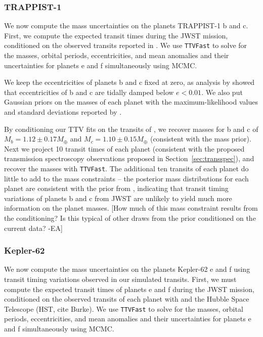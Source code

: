 \subsubsection{TRAPPIST-1}


We now compute the mass uncertainties on the planets TRAPPIST-1 b and c. First, we compute the expected transit times during the JWST mission, conditioned on the observed transits reported in \citet{Grimm2018}. We use \texttt{TTVFast} to solve for the masses, orbital periods, eccentricities, and mean anomalies and their uncertainties for planets e and f simultaneously using MCMC. 

We keep the eccentricities of planets b and c fixed at zero, as analysis by \citet{Luger2017} showed that eccentricities of b and c are tidally damped below $e < 0.01$. We also put Gaussian priors on the masses of each planet with the maximum-likelihood values and standard deviations reported by \citet{Grimm2018}.

By conditioning our TTV fits on the transits of \citet{Grimm2018}, we recover masses for b and c of $M_b = 1.12 \pm 0.17 M_\oplus$ and $M_c = 1.10 \pm 0.15 M_\oplus$ (consistent with the mass prior). Next we project 10 transit times of each planet (consistent with the proposed transmission spectroscopy observations proposed in Section~\ref{sec:transspec}), and recover the masses with \texttt{TTVFast}. The additional ten transits of each planet do little to add to the mass constraints -- the posterior mass distributions for each planet are consistent with the prior from \citet{Grimm2018}, indicating that transit timing variations of planets b and c from JWST are unlikely to yield much more information on the planet masses.  [How much of this mass constraint results from the conditioning?  Is this typical of other draws from the prior conditioned on the current data? -EA] 


\subsubsection{Kepler-62}

We now compute the mass uncertainties on the planets Kepler-62 e and f using transit timing variations observed in our simulated transits. First, we must compute the expected transit times of planets e and f during the JWST mission, conditioned on the observed transits of each planet with \kepler and the Hubble Space Telescope (HST, cite Burke). We use \texttt{TTVFast} to solve for the masses, orbital periods, eccentricities, and mean anomalies and their uncertainties for planets e and f simultaneously using MCMC. 

